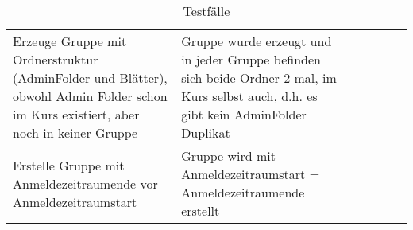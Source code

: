 \begin{table}[]
	\centering
	\caption{Testfälle}
	\label{my-label}
	\begin{tabular}{p{6cm}p{7cm}p{3cm}llll}
		Erzeuge Gruppe mit Ordnerstruktur (AdminFolder und Blätter), obwohl Admin Folder schon im Kurs existiert, aber noch in keiner Gruppe  & Gruppe wurde erzeugt und in jeder Gruppe befinden sich beide Ordner 2 mal, im Kurs selbst auch, d.h. es gibt kein AdminFolder Duplikat                            & \checkmark           &  &  &  \\
		Erstelle Gruppe mit Anmeldezeitraumende vor Anmeldezeitraumstart                                                                     & Gruppe wird mit Anmeldezeitraumstart = Anmeldezeitraumende erstellt                                                                                              & \checkmark           &  &  &  \\


\end{tabular}
\end{table}
